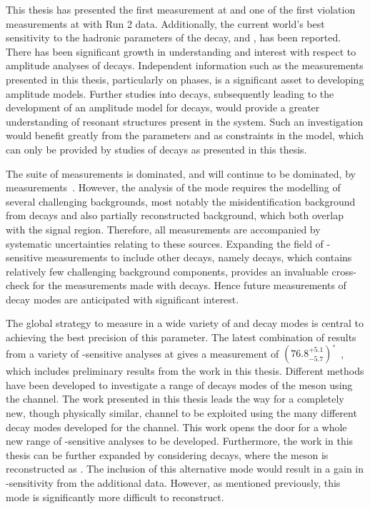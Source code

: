 This thesis has presented the first \btodkst measurement at \lhcb and one of the first \CP violation measurements at \lhcb with Run 2 data. Additionally, the current world's best sensitivity to the hadronic parameters of the \Bm decay, \rb and \deltab, has been reported. There has been significant growth in understanding and interest with respect to amplitude analyses of \B decays. Independent information such as the measurements presented in this thesis, particularly on phases, is a significant asset to developing amplitude models. Further studies into \btodkst decays, subsequently leading to the development of an amplitude model for \decay{\Bm}{\D\KS\pim} decays, would provide a greater understanding of resonant structures present in the \KS\pim system. Such an investigation would benefit greatly from the parameters \rb and \deltab as constraints in the model, which can only be provided by studies of \btodkst decays as presented in this thesis. 

The suite of \Pgamma measurements is dominated, and will continue to be dominated, by \decay{\Bm}{\D\Km} measurements~\cite{LHCb-CONF-2017-004}. However, the analysis of the \decay{\Bm}{\D\Km} mode requires the modelling of several challenging backgrounds, most notably the misidentification background from \decay{\Bm}{\D\pim} decays and also partially reconstructed background, which both overlap with the signal region. Therefore, all \decay{\Bm}{\D\Km} measurements are accompanied by systematic uncertainties relating to these sources. Expanding the field of \Pgamma-sensitive measurements to include other \Bm decays, namely \decay{\Bm}{\D\Kstarm} decays, which contains relatively few challenging background components, provides an invaluable cross-check for the \Pgamma measurements made with \decay{\Bm}{\D\Km} decays. Hence future measurements of \decay{\Bm}{\D\Kstarm} decay modes are anticipated with significant interest.

The global strategy to measure \Pgamma in a wide variety of \B and \D decay modes is central to achieving the best precision of this parameter. The latest combination of results from a variety of \Pgamma-sensitive analyses at \lhcb gives a measurement of $\left(76.8^{+5.1}_{-5.7}\right)^{\circ}$~\cite{LHCb-CONF-2017-004}, which includes preliminary results from the work in this thesis. Different methods have been developed to investigate a range of decays modes of the \Dz meson using the \decay{\Bm}{\D\Km} channel. The work presented in this thesis leads the way for a completely new, though physically similar, \decay{\Bm}{\D\Kstarm} channel to be exploited using the many different \D decay modes developed for the \decay{\Bm}{\D\Km} channel. This work opens the door for a whole new range of \Pgamma-sensitive analyses to be developed. Furthermore, the work in this thesis can be further expanded by considering \decay{\Bm}{\D\Kstarm} decays, where the \Kstarm meson is reconstructed as \Km\piz. The inclusion of this alternative mode would result in a gain in \Pgamma-sensitivity from the additional data. However, as mentioned previously, this mode is significantly more difficult to reconstruct.


